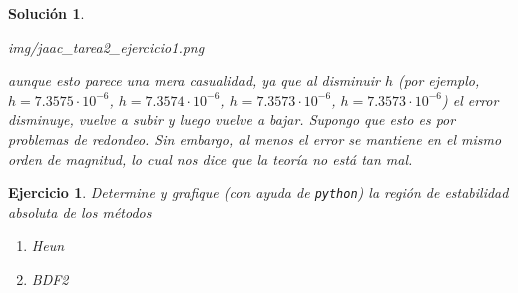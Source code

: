 \documentclass[11pt]{article}
\newtheorem{exercise}{Ejercicio}
\newtheorem*{sol}{Solución}
\begin{document}
\begin{sol}
\begin{enumerate}
\begin{center}
      {img/jaac_tarea2_ejercicio1.png}
      \end{center}
      aunque esto parece una mera casualidad, ya que al disminuir $h$ 
      (por ejemplo, $h=7.3575\cdot 10^{-6}$, $h=7.3574\cdot 10^{-6}$,
      $h=7.3573\cdot 10^{-6}$, $h=7.3573\cdot 10^{-6}$)
      el error disminuye, vuelve a subir y luego vuelve a bajar.
      Supongo que esto es por problemas de redondeo. Sin embargo, al
      menos el error se mantiene en el mismo orden de magnitud, lo
      cual nos dice que la teoría no está tan mal.
  \end{enumerate}
\end{sol}

\begin{exercise}
  Determine y grafique (con ayuda de \texttt{python}) la región de
  estabilidad absoluta de los métodos
  \begin{enumerate}
    \item
      Heun
    \item
      BDF2
  \end{enumerate}
\end{exercise}
\end{document}
